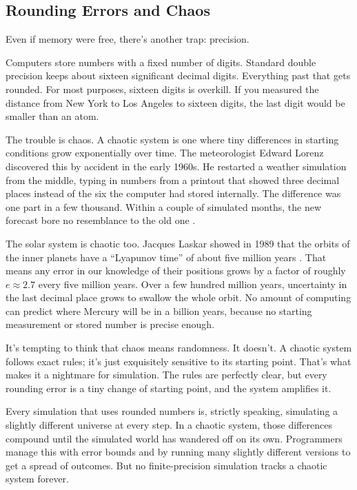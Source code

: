 \subsection{Rounding Errors and Chaos}

Even if memory were free, there's another trap: precision.

Computers store numbers with a fixed number of digits. Standard double precision keeps about sixteen significant decimal digits. Everything past that gets rounded. For most purposes, sixteen digits is overkill. If you measured the distance from New York to Los Angeles to sixteen digits, the last digit would be smaller than an atom.

The trouble is chaos. A chaotic system is one where tiny differences in starting conditions grow exponentially over time. The meteorologist Edward Lorenz discovered this by accident in the early 1960s. He restarted a weather simulation from the middle, typing in numbers from a printout that showed three decimal places instead of the six the computer had stored internally. The difference was one part in a few thousand. Within a couple of simulated months, the new forecast bore no resemblance to the old one \cite{lorenz1963}.

The solar system is chaotic too. Jacques Laskar showed in 1989 that the orbits of the inner planets have a ``Lyapunov time'' of about five million years \cite{laskar1989}. That means any error in our knowledge of their positions grows by a factor of roughly \(e \approx 2.7\) every five million years. Over a few hundred million years, uncertainty in the last decimal place grows to swallow the whole orbit. No amount of computing can predict where Mercury will be in a billion years, because no starting measurement or stored number is precise enough.

\begin{beginnermistakebox}
It's tempting to think that chaos means randomness. It doesn't. A chaotic system follows exact rules; it's just exquisitely sensitive to its starting point. That's what makes it a nightmare for simulation. The rules are perfectly clear, but every rounding error is a tiny change of starting point, and the system amplifies it.
\end{beginnermistakebox}

Every simulation that uses rounded numbers is, strictly speaking, simulating a slightly different universe at every step. In a chaotic system, those differences compound until the simulated world has wandered off on its own. Programmers manage this with error bounds and by running many slightly different versions to get a spread of outcomes. But no finite-precision simulation tracks a chaotic system forever.

